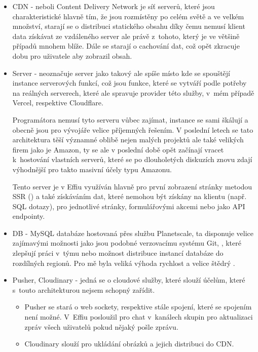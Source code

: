 \documentclass[12pt, a4paper,
openright
]{report}
\begin{document}
	\begin{itemize}
		\item CDN - neboli Content Delivery Network je síť serverů, které jsou charakteristické hlavně tím, že jsou rozmístěny po celém světě a ve velkém množství, starají se o distribuci statického obsahu díky čemu nemusí klient data získávat ze vzdáleného server ale právě z~tohoto, který je ve většině případů mnohem blíže. Dále se starají o cachování dat, což opět zkracuje dobu pro uživatele aby zobrazil obsah.
		\item Server - neoznačuje server jako takový ale spíše místo kde se spouštějí instance serverových funkcí, což jsou funkce, které se vytváří podle potřeby na reálných serverech, které ale spravuje provider této služby, v~mém případě Vercel, respektive Cloudflare.
		
		Programátora nemusí tyto serveru vůbec zajímat, instance se sami škálují a obecně jsou pro vývojáře velice příjemných řešením. V poslední letech se tato architektura těší významné oblibě nejen malých projektů ale také velikých firem jako je Amazon, ty se ale v poslední době opět začínají vracet k~hostování vlastních serverů, které se po dlouholetých diskuzích znovu zdají výhodnější pro takto masivní účely typu Amazonu.
		
		Tento server je v Effiu využíván hlavně pro první zobrazení stránky metodou SSR () a také získáváním dat, které nemohou být získány na klientu (např. SQL dotazy), pro jednotlivé stránky, formulářovými akcemi nebo jako API endpointy.
		
		\item DB - MySQL databáze hostovaná přes službu Planetscale, ta disponuje velice zajímavými možnosti jako jsou  podobné verzovacímu systému Git, , které zlepšují práci v~týmu nebo možnost distribuce  instancí databáze do rozdílných regionů. Pro mě byla veliká výhoda rychlost a velice štědrý .
		\item Pusher, Cloudinary - jedná se o cloudové služby, které slouží účelům, které s~touto architekturou nejsem schopný zařídit.
		
		\begin{itemize}
			\item Pusher se stará o web sockety, respektive stále spojení, které se  spojením není možné. V~Effiu posloužil pro chat v~kanálech skupin pro aktualizaci zpráv všech uživatelů pokud nějaký pošle zprávu.
			
			\item Cloudinary slouží pro ukládání obrázků a jejich distribuci do CDN.
		\end{itemize}
	\end{itemize}
\end{document}
